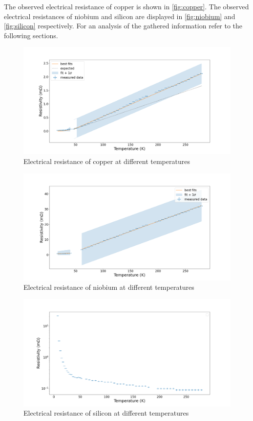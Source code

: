 
The observed electrical resistance of copper is shown in \autoref{fig:copper}. The 
observed electrical resistances of niobium and silicon are displayed in \autoref{fig:niobium} and \autoref{fig:silicon} respectively. For an analysis of the gathered 
information refer to the following sections.

\begin{figure}
	\centering
	\includegraphics[width=1.0\textwidth]{./fig/copper.png}	
	\caption{Electrical resistance of copper at different temperatures}
	\label{fig:copper}
\end{figure}

\begin{figure}
	\centering
	\includegraphics[width=1.0\textwidth]{./fig/niobium.png}
	\caption{Electrical resistance of niobium at different temperatures}
	\label{fig:niobium}
\end{figure}

\begin{figure}
	\centering
	\includegraphics[width=1.0\textwidth]{./fig/silicon.png}
	\caption{Electrical resistance of silicon at different temperatures}
	\label{fig:silicon}
\end{figure}
